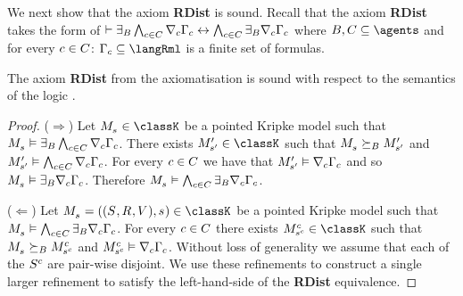 \pagebreak

We next show that the axiom {\bf RDist} is sound.
Recall that the axiom {\bf RDist} takes the form of $\proves \somerefsBs \bigwedge_{\agentC \in \agentsC} \coversC \Gamma_\agentC \iff \bigwedge_{\agentC \in \agentsC} \somerefsBs \coversC \Gamma_\agentC$ where $\agentsB, \agentsC \subseteq \agents$ and for every $\agentC \in \agentsC$: $\Gamma_\agentC \subseteq \langRml$ is a finite set of formulas.

\begin{lemma}\label{rml-k-rdist}
The axiom {\bf RDist} from the axiomatisation \axiomRmlK{} is sound with respect to the semantics of the logic \logicRmlK{}.
\end{lemma}

\begin{proof}
($\Rightarrow$) Let $\kPModel{\kStateS} \in \classK$ be a pointed Kripke model such that $\kPModel{\kStateS} \entails \somerefsBs \bigwedge_{\agentC \in \agentsC} \coversC \Gamma_\agentC$.
There exists $\kPModelP{\kStateSP} \in \classK$ such that $\kPModel{\kStateS} \simulatesBs \kPModelP{\kStateSP}$ and $\kPModelP{\kStateSP} \entails \bigwedge_{\agentC \in \agentsC} \coversC \Gamma_\agentC$.
For every $\agentC \in \agentsC$ we have that $\kPModelP{\kStateSP} \entails \coversC \Gamma_\agentC$ and so $\kPModel{\kStateS} \entails \somerefsBs \coversC \Gamma_\agentC$.
Therefore $\kPModel{\kStateS} \entails \bigwedge_{\agentC \in \agentsC} \somerefsBs \coversC \Gamma_\agentC$.

($\Leftarrow$) Let $\kPModelAndTuple{\kStateS} \in \classK$ be a pointed Kripke model such that $\kPModel{\kStateS} \entails \bigwedge_{\agentC \in \agentsC} \somerefsBs \coversC \Gamma_\agentC$.
For every $\agentC \in \agentsC$ there exists $\kPModel[\agentC]{\kStateS[\agentC]} \in \classK$ such that $\kPModel{\kStateS} \simulatesBs \kPModel[\agentC]{\kStateS[\agentC]}$ and $\kPModel[\agentC]{\kStateS[\agentC]} \entails \coversC \Gamma_\agentC$.
Without loss of generality we assume that each of the $\kStates[\agentC]$ are pair-wise disjoint.
We use these refinements to construct a single larger refinement to satisfy the left-hand-side of the {\bf RDist} equivalence.


\end{proof}
